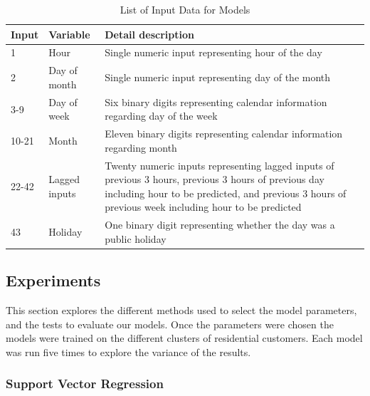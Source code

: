\begin{table}
	\caption{List of Input Data for Models}
	\label{tab:feature}
	\begin{tabular}{p{3cm}p{5cm}p{8cm}}
		\toprule
		Input & Variable      & Detail description \\
		\midrule
		1     & Hour          & Single numeric input representing hour of the day                                                                                              \\
		2     & Day of month  & Single numeric input representing day of the month                                                                                             \\
		3-9   & Day of week   & Six binary digits representing calendar information regarding day of the week                                                                                            \\
		10-21 & Month         & Eleven binary digits representing calendar information regarding month                                                                                         \\
		22-42 & Lagged inputs & Twenty numeric inputs representing lagged inputs of previous 3 hours, previous 3 hours of previous day including hour to be predicted, and previous 3 hours of previous week including hour to be predicted \\
		43    & Holiday       & One binary digit representing whether the day was a public holiday  \\     \bottomrule                                                           
	\end{tabular}
\end{table}


\subsection{Experiments}

This section explores the different methods used to select the model parameters, and the tests to evaluate our models. Once the parameters were chosen the models were trained on the different clusters of residential customers. Each model was run five times to explore the variance of the results.  

\subsubsection{Support Vector Regression}

